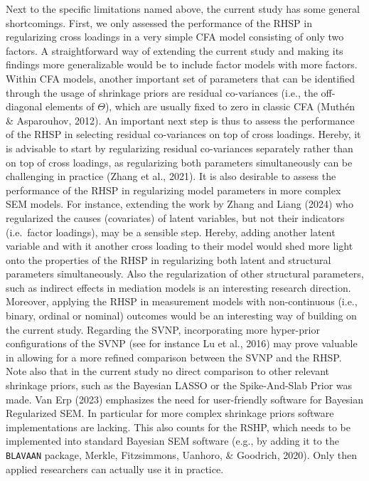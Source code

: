 \documentclass[
  man, donotrepeattitle,floatsintext]{apa6}
\begin{document}
Next to the specific limitations named above, the current study has some
general shortcomings. First, we only assessed the performance of the
RHSP in regularizing cross loadings in a very simple CFA model
consisting of only two factors. A straightforward way of extending the
current study and making its findings more generalizable would be to
include factor models with more factors. Within CFA models, another
important set of parameters that can be identified through the usage of
shrinkage priors are residual co-variances (i.e., the off-diagonal
elements of \(\Theta\)), which are usually fixed to zero in classic CFA
(Muthén \& Asparouhov, 2012). An important next step is thus to assess the
performance of the RHSP in selecting residual co-variances on top of
cross loadings. Hereby, it is advisable to start by regularizing
residual co-variances separately rather than on top of cross loadings,
as regularizing both parameters simultaneously can be challenging in
practice (Zhang et al., 2021). It is also desirable to assess the
performance of the RHSP in regularizing model parameters in more complex
SEM models. For instance, extending the work by Zhang and Liang (2024) who
regularized the causes (covariates) of latent variables, but not their
indicators (i.e.~factor loadings), may be a sensible step. Hereby,
adding another latent variable and with it another cross loading to their model
would shed more light onto the properties of the RHSP in regularizing
both latent and structural parameters simultaneously. Also the
regularization of other structural parameters, such as indirect effects in
mediation models is an interesting research direction. Moreover,
applying the RHSP in measurement models with non-continuous (i.e.,
binary, ordinal or nominal) outcomes would be an interesting way of
building on the current study. Regarding the SVNP, incorporating more hyper-prior configurations of the SVNP (see
for instance Lu et al., 2016) may prove valuable in allowing for a
more refined comparison between the SVNP and the RHSP. Note also that in
the current study no direct comparison to other relevant shrinkage
priors, such as the Bayesian LASSO or the Spike-And-Slab Prior was made.
Van Erp (2023) emphasizes the need for user-friendly software for
Bayesian Regularized SEM. In particular for more complex shrinkage
priors software implementations are lacking. This also counts for the
RSHP, which needs to be implemented into standard Bayesian SEM software
(e.g., by adding it to the \texttt{BLAVAAN} package, Merkle, Fitzsimmons, Uanhoro, \& Goodrich, 2020).
Only then applied researchers can actually use it in practice.
\end{document}
